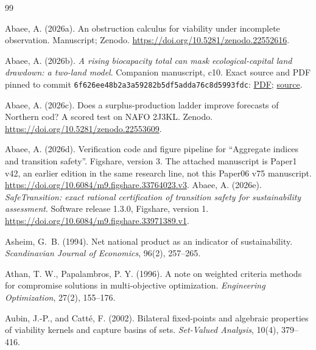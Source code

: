 \documentclass[preprint,11pt,authoryear]{elsarticle}
\theoremstyle{definition}
\theoremstyle{remark}
\begin{document}
\begin{thebibliography}{99}
\makeatletter\renewcommand{\@biblabel}[1]{}\makeatother

 Abaee, A. (2026a). An obstruction calculus for viability under incomplete observation. Manuscript; Zenodo. \url{https://doi.org/10.5281/zenodo.22552616}.

 Abaee, A. (2026b). \emph{A rising biocapacity total can mask ecological-capital land drawdown: a two-land model}. Companion manuscript, c10. Exact source and PDF pinned to commit \texttt{6f626ee48b2a3a59282b5df5adda76c8d5993fdc}: \href{https://github.com/MIKEAA2020/general-sustainability/blob/6f626ee48b2a3a59282b5df5adda76c8d5993fdc/agent%202%20productivity%20illusion/output_v45_ecomod_continued_10_gemini38_v4base_si_review_20261026/ecomod_continued_10.pdf}{PDF}; \href{https://github.com/MIKEAA2020/general-sustainability/blob/6f626ee48b2a3a59282b5df5adda76c8d5993fdc/agent%202%20productivity%20illusion/output_v45_ecomod_continued_10_gemini38_v4base_si_review_20261026/ecomod_continued_10.tex}{source}.

 Abaee, A. (2026c). Does a surplus-production ladder improve forecasts of Northern cod? A scored test on NAFO 2J3KL. Zenodo. \url{https://doi.org/10.5281/zenodo.22553609}.

 Abaee, A. (2026d). Verification code and figure pipeline for ``Aggregate indices and transition safety''. Figshare, version 3. The attached manuscript is Paper1 v42, an earlier edition in the same research line, not this Paper06 v75 manuscript. \url{https://doi.org/10.6084/m9.figshare.33764023.v3}.
 Abaee, A. (2026e). \emph{SafeTransition: exact rational certification of transition safety for sustainability assessment}. Software release 1.3.0, Figshare, version 1. \url{https://doi.org/10.6084/m9.figshare.33971389.v1}.

 Asheim, G.~B. (1994). Net national product as an indicator of sustainability. \emph{Scandinavian Journal of Economics}, 96(2), 257--265.

 Athan, T. W., Papalambros, P. Y. (1996). A note on weighted criteria methods for compromise solutions in multi-objective optimization. \emph{Engineering Optimization}, 27(2), 155--176.

 Aubin, J.-P., and Catt\'e, F. (2002). Bilateral fixed-points and algebraic properties of viability kernels and capture basins of sets. \emph{Set-Valued Analysis}, 10(4), 379--416.


\end{thebibliography}
\end{document}
